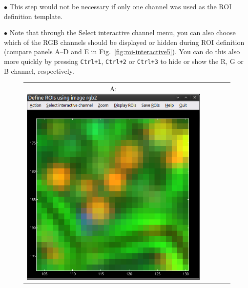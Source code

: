 \documentclass[a4paper, 11pt]{article}
\newcommand{\ttt}[1]{\texttt{#1}}
\newcommand{\lans}[1]{{\color{magenta}#1}}
\newcounter{step}
\newcommand\bul{\vskip5pt\noindent$\bullet${ }}
\begin{document}
\bul This step would not be necessary if only one channel was used as the ROI definition template. 

\bul Note that through the \lans{Select interactive channel} menu, you can also choose which of the RGB channels should be displayed or hidden during ROI definition (compare panels A--D and E in Fig.~\ref{fig:roi-interactive5}). You can do this also more quickly by pressing \ttt{Ctrl+1}, \ttt{Ctrl+2} or \ttt{Ctrl+3} to hide or show the R, G or B channel, respectively.

\begin{figure}[!ht]
\centering
\begin{tabular}{ccccc}
A: \includegraphics[scale=0.23]{figs3/LANS-roi-interactive0}
&

\end{tabular}
\end{figure}
\end{document}
